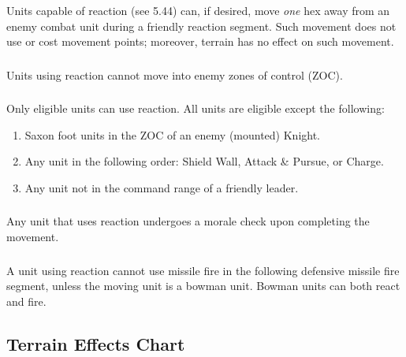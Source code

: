 \subsubsection[How Reaction Works]{} Units capable of reaction (see 5.44) can, if desired, move \textit{one} hex away from an enemy combat unit during a friendly reaction segment. Such movement does not use or cost movement points; moreover, terrain has no effect on such movement.

\subsubsection[Reaction and ZOCs]{} Units using reaction cannot move into enemy zones of control (ZOC).

\subsubsection[Eligible Units]{} Only eligible units can use reaction. All units are eligible except the following:

\begin{enumerate}
  \item Saxon foot units in the ZOC of an enemy (mounted) Knight.
  \item Any unit in the following order: Shield Wall, Attack \& Pursue, or Charge.
  \item Any unit not in the command range of a friendly leader.
\end{enumerate}

\subsubsection[Morale Check]{} Any unit that uses reaction undergoes a morale check upon completing the movement.

\subsubsection[Missile Fire]{} A unit using reaction cannot use missile fire in the following defensive missile fire segment, unless the moving unit is a bowman unit. Bowman units can both react and fire.

\subsection{Terrain Effects Chart}

